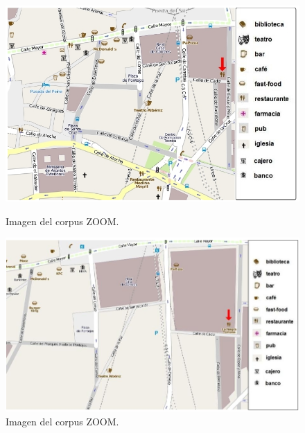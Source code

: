 \begin{figure}
\begin{minipage}[b]{0.48\linewidth}
\centering
\includegraphics[width=\textwidth]{images/corpus/mapa5.png}
\caption{Imagen del corpus ZOOM.}
\label{mapa5}
\end{minipage}
\hspace*{0cm}
\begin{minipage}[b]{0.55\linewidth}
\centering
\includegraphics[width=\textwidth]{images/corpus/mapa15.png}
\caption{Imagen del corpus ZOOM.}
\label{mapa6}
\end{minipage}
\end{figure}



